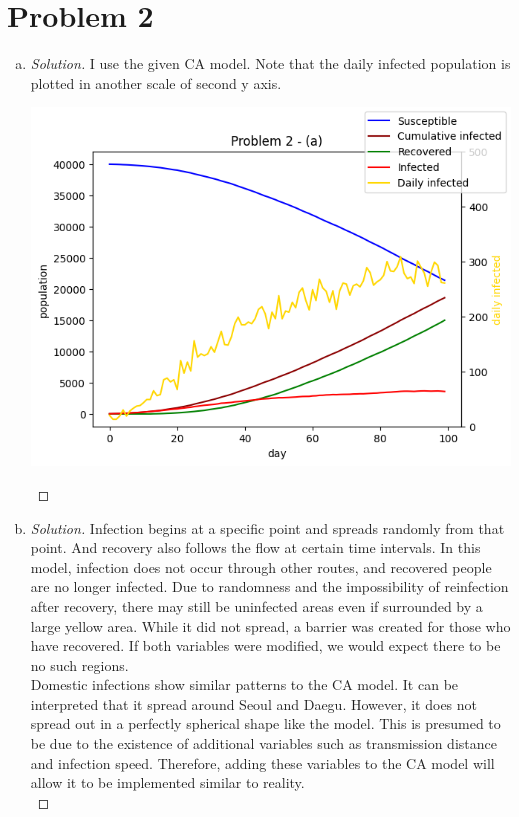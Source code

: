 \section*{Problem 2}
	\begin{enumerate} [a)]
		\item 
		\begin{proof} [Solution]
			I use the given CA model. Note that the daily infected population is plotted in another scale of second y axis.
			\begin{center}
				\includegraphics[scale=0.7]{Problem2_a.png}
			\end{center}
		\end{proof}
		\item 
		\begin{proof} [Solution]
			Infection begins at a specific point and spreads randomly from that point. And recovery also follows the flow at certain time intervals. In this model, infection does not occur through other routes, and recovered people are no longer infected. Due to randomness and the impossibility of reinfection after recovery, there may still be uninfected areas even if surrounded by a large yellow area. While it did not spread, a barrier was created for those who have recovered. If both variables were modified, we would expect there to be no such regions.\\
			Domestic infections show similar patterns to the CA model. It can be interpreted that it spread around Seoul and Daegu. However, it does not spread out in a perfectly spherical shape like the model. This is presumed to be due to the existence of additional variables such as transmission distance and infection speed. Therefore, adding these variables to the CA model will allow it to be implemented similar to reality.\\
		\end{proof}
	\end{enumerate}